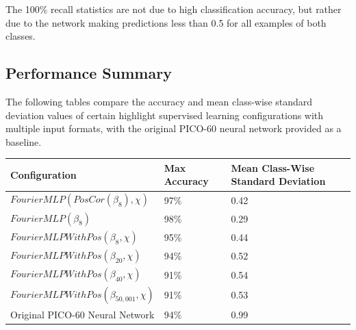 \documentclass[10pt]{article}
\begin{document}
The 100\% recall statistics are not due to high classification accuracy, but rather due to the network making predictions less than 0.5 for all examples of both classes.

\subsection{Performance Summary}

The following tables compare the accuracy and mean class-wise standard deviation values of certain highlight supervised learning configurations with multiple input formats, with the original PICO-60 neural network provided as a baseline.

\begin{minipage}{\textwidth}
    \begin{center}
        \begin{tabular}{|l|l|l|}
            \hline
            Configuration & Max Accuracy & Mean Class-Wise Standard Deviation \\
            \hline
            $FourierMLP(PosCor(\beta_{8}), \chi)$ & 97\% & 0.42 \\
            \hline
            $FourierMLP(\beta_{8})$ & 98\% & 0.29 \\
            \hline
            $FourierMLPWithPos(\beta_{8}, \chi)$ & 95\% & 0.44 \\
            \hline
            $FourierMLPWithPos(\beta_{20}, \chi)$ & 94\% & 0.52 \\
            \hline
            $FourierMLPWithPos(\beta_{40}, \chi)$ & 91\% & 0.54 \\
            \hline
            $FourierMLPWithPos(\beta_{50,001}, \chi)$ & 91\% & 0.53 \\
            \hline
            Original PICO-60 Neural Network & 94\% & 0.99 \\
            \hline
        \end{tabular}
    \end{center}
\end{minipage}
\end{document}
